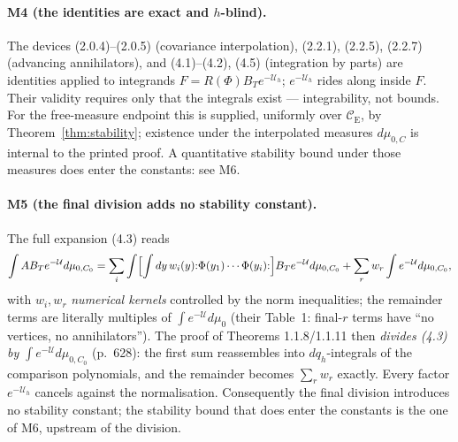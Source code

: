 \documentclass[11pt,a4paper]{article}
\theoremstyle{plain}
\theoremstyle{definition}
\theoremstyle{plain}
\theoremstyle{definition}
\newcommand{\CE}{\mathcal{C}_{\mathrm E}}
\begin{document}
\paragraph{M4 (the identities are exact and $h$-blind).}
The devices (2.0.4)--(2.0.5) (covariance interpolation), (2.2.1), (2.2.5), (2.2.7)
(advancing annihilators), and (4.1)--(4.2), (4.5) (integration by parts) are identities
applied to integrands $F=R(\Phi)B_Te^{-\mathcal U_h}$; $e^{-\mathcal U_h}$ rides along
inside $F$. Their validity requires only that the integrals exist --- integrability, not
bounds. For the free-measure endpoint this is supplied, uniformly over $\CE$, by
Theorem~\ref{thm:stability}; existence under the interpolated measures $d\mu_{0,C}$ is
internal to the printed proof.  A quantitative stability bound under those measures does
enter the constants: see M6.

\paragraph{M5 (the final division adds no stability constant).}
The full expansion (4.3) reads
\[
  \int AB_T e^{-\mathcal U}d\mu_{0,C_0}
  =\sum_i\int\Bigl[\int dy\,w_i(y){:}\Phi(y_1)\cdots\Phi(y_i){:}\Bigr]B_T
   e^{-\mathcal U}d\mu_{0,C_0}
  +\sum_r w_r\int e^{-\mathcal U}d\mu_{0,C_0},
\]
with $w_i,w_r$ \emph{numerical kernels} controlled by the norm inequalities; the
remainder terms are literally multiples of $\int e^{-\mathcal U}d\mu_0$ (their Table~1:
final-$r$ terms have ``no vertices, no annihilators''). The proof of Theorems
1.1.8/1.1.11 then \emph{divides (4.3) by $\int e^{-\mathcal U}d\mu_{0,C_0}$} (p.~628):
the first sum reassembles into $dq_h$-integrals of the comparison polynomials, and the
remainder becomes $\sum_rw_r$ exactly. Every factor $e^{-\mathcal U_h}$ cancels against
the normalisation. Consequently the final division introduces no stability constant; the
stability bound that does enter the constants is the one of M6, upstream of the division.
\end{document}
